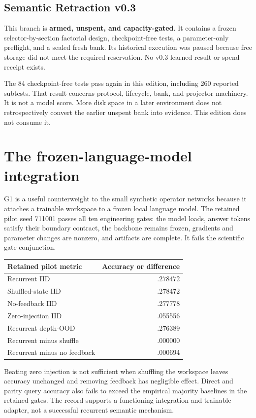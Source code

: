 \documentclass[11pt]{article}
\begin{document}
\subsection{Semantic Retraction v0.3}
This branch is \textbf{armed, unspent, and capacity-gated}. It contains a frozen selector-by-section factorial design, checkpoint-free tests, a parameter-only preflight, and a sealed fresh bank. Its historical execution was paused because free storage did not meet the required reservation. No v0.3 learned result or spend receipt exists. \cite{nsr}

The 84 checkpoint-free tests pass again in this edition, including 260 reported subtests. That result concerns protocol, lifecycle, bank, and projector machinery. It is not a model score. More disk space in a later environment does not retrospectively convert the earlier unspent bank into evidence. This edition does not consume it.

\section{The frozen-language-model integration}
G1 is a useful counterweight to the small synthetic operator networks because it attaches a trainable workspace to a frozen local language model. The retained pilot seed 711001 passes all ten engineering gates: the model loads, answer tokens satisfy their boundary contract, the backbone remains frozen, gradients and parameter changes are nonzero, and artifacts are complete. It fails the scientific gate conjunction. \cite{g1,g1d}

\begin{center}\begin{tabular}{lr}
\toprule Retained pilot metric & Accuracy or difference\\\midrule
Recurrent IID & .278472\\
Shuffled-state IID & .278472\\
No-feedback IID & .277778\\
Zero-injection IID & .055556\\
Recurrent depth-OOD & .276389\\
Recurrent minus shuffle & .000000\\
Recurrent minus no feedback & .000694\\\bottomrule
\end{tabular}\end{center}
Beating zero injection is not sufficient when shuffling the workspace leaves accuracy unchanged and removing feedback has negligible effect. Direct and parity query accuracy also fails to exceed the empirical majority baselines in the retained gates. The record supports a functioning integration and trainable adapter, not a successful recurrent semantic mechanism.
\end{document}
